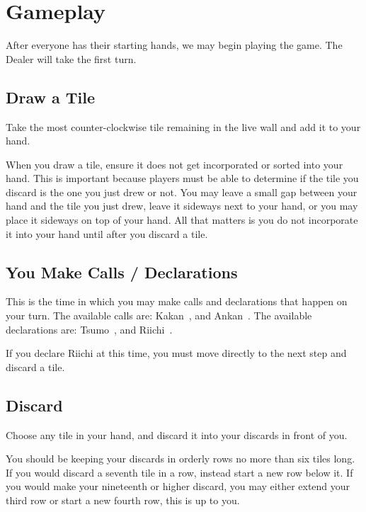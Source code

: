\section{Gameplay}\label{core:sec:gameplay}

After everyone has their starting hands, we may begin playing the game. The Dealer will take the first turn.

\subsection{Draw a Tile}\label{core:ssec:draw-a-tile}

Take the most counter-clockwise tile remaining in the live wall and add it to your hand. 

When you draw a tile, ensure it does not get incorporated or sorted into your hand. This is important because players must be able to determine if the tile you discard is the one you just drew or not. You may leave a small gap between your hand and the tile you just drew, leave it sideways next to your hand, or you may place it sideways on top of your hand. All that matters is you do not incorporate it into your hand until after you discard a tile.



\subsection{You Make Calls / Declarations}\label{core:ssec:you-call-declare}

This is the time in which you may make calls and declarations that happen on your turn. The available calls are: Kakan~, and Ankan~. The available declarations are: Tsumo~, and Riichi~.

If you declare Riichi at this time, you must move directly to the next step and discard a tile.

\subsection{Discard}\label{core:ssec:discard}

Choose any tile in your hand, and discard it into your discards in front of you.

You should be keeping your discards in orderly rows no more than six tiles long. If you would discard a seventh tile in a row, instead start a new row below it. If you would make your nineteenth or higher discard, you may either extend your third row or start a new fourth row, this is up to you.

